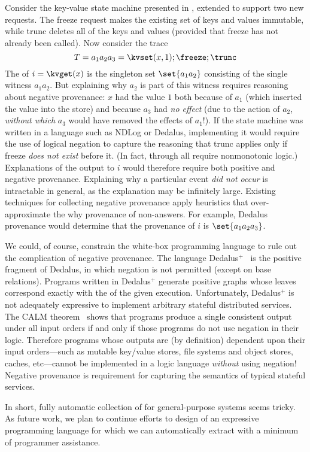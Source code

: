 \begin{techreport}
Consider the key-value state machine presented in ,
extended to support two new requests. The freeze request makes the existing set
of keys and values immutable, while trunc deletes all of the keys and values
(provided that freeze has not already been called). Now consider the trace
\[
  T = a_1 a_2 a_3 = \kvset(x,1); \freeze; \trunc
\]
The \watprovenance{} of $i = \kvget(x)$ is the singleton set $\set{a_1a_2}$
consisting of the single witness $a_1a_2$. But explaining why $a_2$ is part of
this witness requires reasoning about negative provenance: $x$ had the value
$1$ both because of $a_1$ (which inserted the value into the store) and because
$a_3$ had \emph{no effect} (due to the action of $a_2$, \emph{without which}
$a_3$ would have removed the effects of $a_1$!). If the state machine was
written in a language such as NDLog or Dedalus, implementing it would require
the use of logical negation to capture the reasoning that trunc applies only if
freeze \emph{does not exist} before it.  (In fact, 
through  all require nonmonotonic logic.)
Explanations of the output to $i$ would therefore require both positive and
negative provenance. Explaining why a particular event \emph{did not occur} is
intractable in general, as the explanation may be infinitely large.  Existing
techniques for collecting negative provenance apply heuristics that
over-approximate the why provenance of non-answers. For example, Dedalus
provenance would determine that the provenance of $i$ is $\set{a_1a_2a_3}$.

\newcommand{\dedalusplus}{Dedalus$^+$}
We could, of course, constrain the white-box programming language to rule out
the complication of negative provenance.  The language
\dedalusplus~\cite{marczak2012confluence} is the positive fragment of Dedalus,
in which negation is not permitted (except on base relations). Programs written
in \dedalusplus{} generate positive \whyprovenance{} graphs whose leaves
correspond exactly with the \watprovenance{} of the given execution.
Unfortunately, \dedalusplus{} is not adequately expressive to implement
arbitrary stateful distributed services. The CALM
theorem~\cite{alvaro2011consistency,ameloot2013transducers} shows that programs
produce a single consistent output under all input orders if and only if those
programs do not use negation in their logic. Therefore programs whose outputs
are (by definition) dependent upon their input orders---such as mutable
key/value stores, file systems and object stores, caches, etc---cannot be
implemented in a logic language \emph{without} using negation! Negative
provenance is requirement for capturing the semantics of typical stateful
services.

In short, fully automatic collection of \watprovenance{} for general-purpose
systems seems tricky. As future work, we plan to continue efforts to design of
an expressive programming language for which we can automatically extract
\watprovenance{} with a minimum of programmer assistance.
\end{techreport}
